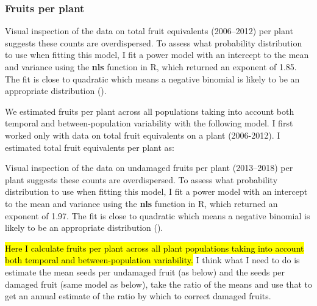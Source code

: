 \documentclass[12pt, oneside, titlepage]{article}   	%
\begin{document}

\subsubsection*{Fruits per plant}

Visual inspection of the data on total fruit equivalents (2006--2012) per plant suggests these counts are overdispersed. To assess what probability distribution to use when fitting this model, I fit a power model with an intercept to the mean and variance using the \textbf{nls} function in R, which returned an exponent of 1.85. The fit is close to quadratic which means a negative binomial is likely to be an appropriate distribution (\cite{linden2011}). 

We estimated fruits per plant across all populations taking into account both temporal and between-population variability with the following model. I first worked only with data on total fruit equivalents on a plant (2006-2012). I estimated total fruit equivalents per plant as: 

Visual inspection of the data on undamaged fruits per plant (2013--2018) per plant suggests these counts are overdispersed. To assess what probability distribution to use when fitting this model, I fit a power model with an intercept to the mean and variance using the \textbf{nls} function in R, which returned an exponent of 1.97. The fit is close to quadratic which means a negative binomial is likely to be an appropriate distribution (\cite{linden2011}). 

\hl{Here I calculate fruits per plant across all plant populations taking into account both temporal and between-population variability.} I think what I need to do is estimate the mean seeds per undamaged fruit (as below) and the seeds per damaged fruit (same model as below), take the ratio of the means and use that to get an annual estimate of the ratio by which to correct damaged fruits. 
\end{document}
